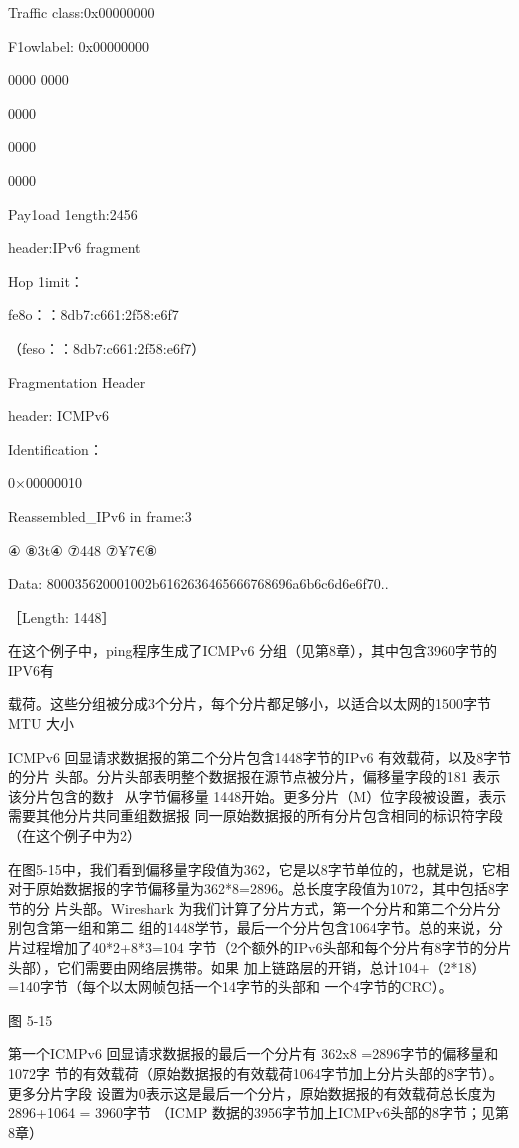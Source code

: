 Traffic class:0x00000000

F1owlabel: 0x00000000

0000 0000

0000

0000

0000

Pay1oad 1ength:2456

header:IPv6 fragment

Hop 1imit：

fe8o：：8db7:c661:2f58:e6f7

（feso：：8db7:c661:2f58:e6f7）

Fragmentation Header

header: ICMPv6

Identification：

0×00000010

Reassembled\_IPv6 in frame:3

④ ⑧3t④ ⑦448 ⑦¥7€⑧

Data: 800035620001002b6162636465666768696a6b6c6d6e6f70..

［Length: 1448］

在这个例子中，ping程序生成了ICMPv6 分组（见第8章），其中包含3960字节的IPV6有

载荷。这些分组被分成3个分片，每个分片都足够小，以适合以太网的1500字节 MTU 大小


ICMPv6 回显请求数据报的第二个分片包含1448字节的IPv6 有效载荷，以及8字节的分片
头部。分片头部表明整个数据报在源节点被分片，偏移量字段的181 表示该分片包含的数扌
从字节偏移量 1448开始。更多分片（M）位字段被设置，表示需要其他分片共同重组数据报
同一原始数据报的所有分片包含相同的标识符字段（在这个例子中为2）

在图5-15中，我们看到偏移量字段值为362，它是以8字节单位的，也就是说，它相
对于原始数据报的字节偏移量为362*8=2896。总长度字段值为1072，其中包括8字节的分
片头部。Wireshark 为我们计算了分片方式，第一个分片和第二个分片分别包含第一组和第二
组的1448学节，最后一个分片包含1064字节。总的来说，分片过程增加了40*2+8*3=104
字节（2个额外的IPv6头部和每个分片有8字节的分片头部），它们需要由网络层携带。如果
加上链路层的开销，总计104+（2*18）=140字节（每个以太网帧包括一个14字节的头部和
一个4字节的CRC）。


图 5-15

第一个ICMPv6 回显请求数据报的最后一个分片有 362x8 =2896字节的偏移量和1072字
节的有效载荷（原始数据报的有效载荷1064字节加上分片头部的8字节）。更多分片字段
设置为0表示这是最后一个分片，原始数据报的有效载荷总长度为2896+1064 = 3960字节
（ICMP 数据的3956字节加上ICMPv6头部的8字节；见第8章）


